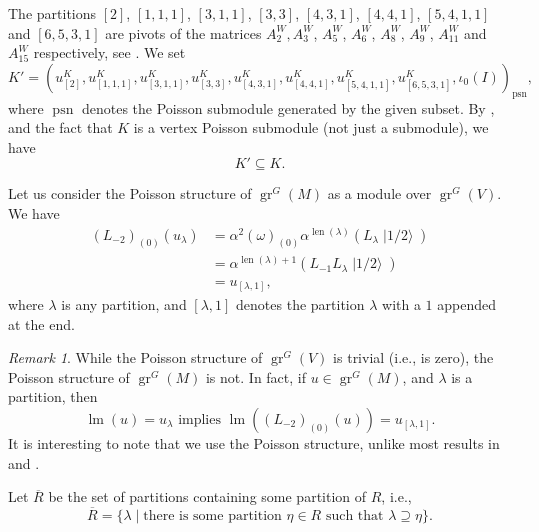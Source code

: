 \documentclass[a4paper, 12pt, reqno]{amsart}
\theoremstyle{remark}
\newtheorem{remark}[theorem]{Remark}
\DeclareMathOperator{\gr}{gr}
\DeclareMathOperator{\lm}{lm}
\DeclareMathOperator{\len}{len}
\DeclareMathOperator{\psn}{psn}
\DeclareMathOperator{\vachalf}{|1/2\rangle}
\begin{document}
The partitions $[2]$, $[1, 1, 1]$, $[3, 1, 1]$, $[3, 3]$, $[4, 3, 1]$, $[4, 4, 1]$, $[5, 4, 1, 1]$ and $[6, 5, 3, 1]$ are pivots of the matrices $A^W_2, A^W_3$, $A^W_5$, $A^W_6$, $A^W_8$, $A^W_9$, $A^W_{11}$ and $A^W_{15}$ respectively, see \cite[ising-modules.ipynb]{sagemath2}.
We set
\begin{equation*}
  K' = (u^K_{[2]}, u^K_{[1, 1, 1]}, u^K_{[3, 1, 1]}, u^K_{[3, 3]}, u^K_{[4, 3, 1]}, u^K_{[4, 4, 1]}, u^K_{[5, 4, 1, 1]}, u^K_{[6, 5, 3, 1]}, \iota_0(I))_{\psn},
\end{equation*}
where $\psn$ denotes the Poisson submodule generated by the given subset.
By ,  and the fact that $K$ is a vertex Poisson submodule (not just a submodule), we have
\begin{equation*}
  K' \subseteq K.
\end{equation*}

Let us consider the Poisson structure of $\gr^G(M)$ as a module over $\gr^G(V)$.
We have
\begin{align*}
  (L_{-2})_{(0)}(u_{\lambda}) &= \alpha^2(\omega)_{(0)}\alpha^{\len(\lambda)}(L_{\lambda}\vachalf) \\
                              &= \alpha^{\len(\lambda) + 1}(L_{-1}L_{\lambda}\vachalf) \\
                              &= u_{[\lambda, 1]},
\end{align*}
where $\lambda$ is any partition, and $[\lambda, 1]$ denotes the partition $\lambda$ with a $1$ appended at the end.

\begin{remark}
  \label{rmk:51}
  While the Poisson structure of $\gr^G(V)$ is trivial (i.e., is zero), the Poisson structure of $\gr^G(M)$ is not.
  In fact, if $u \in \gr^G(M)$, and $\lambda$ is a partition, then
  \begin{equation*}
    \lm(u) = u_{\lambda}\text{ implies }\lm((L_{-2})_{(0)}(u)) = u_{[\lambda, 1]}.
  \end{equation*}
  It is interesting to note that we use the Poisson structure, unlike most results in  and \cite{andrews_singular_2022}.
\end{remark}

Let $\overline{R}$ be the set of partitions containing some partition of $R$, i.e.,
\begin{equation*}
  \overline{R} = \{\lambda \mid \text{there is some partition $\eta \in R$ such that $\lambda \supseteq \eta$}\}.
\end{equation*}
\end{document}
